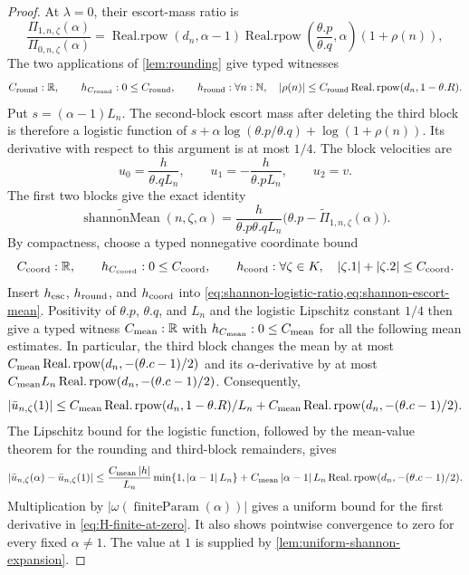 \documentclass[9pt]{extarticle}
\theoremstyle{definition}
\theoremstyle{remark}
\newcommand{\R}{\mathbb R}
\newcommand{\N}{\mathbb N}
\newcommand{\abs}[1]{\left\lvert #1\right\rvert}
\begin{document}
\begin{proof}
At $\lambda=0$, their escort-mass ratio is
\begin{equation}
 \frac{\Pi_{1,n,\zeta}(\alpha)}{\Pi_{0,n,\zeta}(\alpha)}
 =\operatorname{Real.rpow}(d_n,\alpha-1)
   \operatorname{Real.rpow}\left(\frac{\theta.p}{\theta.q},\alpha\right)
   (1+\rho(n)),
 \label{eq:shannon-logistic-ratio}
\end{equation}
The two applications of \cref{lem:rounding} give typed witnesses
\[
 C_{\rm round}:\R,\qquad h_{C_{\rm round}}:0\leq C_{\rm round},\qquad
 h_{\rm round}:\forall n:\N,\quad
 \abs{\rho(n)}\leq C_{\rm round}
   \operatorname{Real.rpow}(d_n,1-\theta.R).
\]
Put
$s=(\alpha-1)L_n$. The
second-block escort mass after deleting the third block is therefore a
logistic function of
$s+\alpha\log(\theta.p/\theta.q)+\log(1+\rho(n))$. Its derivative with respect to this
argument is at most $1/4$. The block velocities are
\[
 u_0=\frac{h}{\theta.qL_n},\qquad
 u_1=-\frac{h}{\theta.pL_n},\qquad u_2=v.
\]
The first two blocks give the exact identity
\begin{equation}
 \widetilde{\operatorname{shannonMean}}(n,\zeta,\alpha)
 =\frac{h}{\theta.p\theta.qL_n}
   \bigl(\theta.p-\widetilde\Pi_{1,n,\zeta}(\alpha)\bigr).
 \label{eq:shannon-escort-mean}
\end{equation}
By compactness, choose a typed nonnegative coordinate bound
\[
 C_{\rm coord}:\R,\qquad h_{C_{\rm coord}}:0\leq C_{\rm coord},\qquad
 h_{\rm coord}:\forall\zeta\in K,\quad
   \abs{\zeta.1}+\abs{\zeta.2}\leq C_{\rm coord}.
\]
Insert $h_{\rm esc}$, $h_{\rm round}$, and $h_{\rm coord}$ into
\cref{eq:shannon-logistic-ratio,eq:shannon-escort-mean}.  Positivity of
$\theta.p$, $\theta.q$, and $L_n$ and the logistic Lipschitz constant $1/4$
then give a typed witness
$C_{\rm mean}:\R$ with $h_{C_{\rm mean}}:0\leq C_{\rm mean}$ for all the
following mean estimates.  In particular, the third block changes the mean
by at most
$C_{\rm mean}\operatorname{Real.rpow}(d_n,-(\theta.c-1)/2)$ and its
$\alpha$-derivative by at most
$C_{\rm mean}L_n\operatorname{Real.rpow}(d_n,-(\theta.c-1)/2)$.  Consequently,
\[
 \abs{\bar u_{n,\zeta}(1)}\leq
 C_{\rm mean}\operatorname{Real.rpow}(d_n,1-\theta.R)/L_n
 +C_{\rm mean}\operatorname{Real.rpow}(d_n,-(\theta.c-1)/2).
\]
The Lipschitz bound for the
logistic function, followed by the mean-value theorem for the rounding and
third-block remainders, gives
\begin{equation}
 \abs{\bar u_{n,\zeta}(\alpha)-\bar u_{n,\zeta}(1)}
 \leq \frac{C_{\rm mean}\abs h}{L_n}
       \min\{1,\abs{\alpha-1}L_n\}
 +C_{\rm mean}\abs{\alpha-1}L_n
   \operatorname{Real.rpow}(d_n,-(\theta.c-1)/2).
 \label{eq:shannon-mean-bound}
\end{equation}
Multiplication by
$\abs{\omega(\operatorname{finiteParam}(\alpha))}$ gives a uniform bound for the first
derivative in \cref{eq:H-finite-at-zero}. It also shows pointwise convergence to zero
for every fixed $\alpha\neq1$. The value at $1$ is supplied by
\cref{lem:uniform-shannon-expansion}.


\end{proof}
\end{document}
